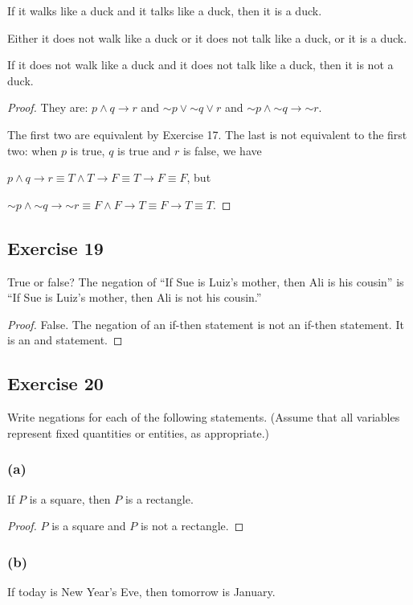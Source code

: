 \documentclass[14pt]{extarticle}
\begin{document}
If it walks like a duck and it talks like a duck, then it is a duck.

Either it does not walk like a duck or it does not talk like a duck, or it is a duck.

If it does not walk like a duck and it does not talk like a duck, then it is not a duck.

\begin{proof}
    They are: $p \wedge q \to r$ and ${\sim p} \vee {\sim q} \vee r$ and ${\sim p} \wedge {\sim q} \to {\sim r}$.

    The first two are equivalent by Exercise 17. The last is not equivalent to the first two: when $p$ is true, $q$ is true and $r$ is false, we have

    $p \wedge q \to r \equiv T \wedge T \to F \equiv T \to F \equiv F$, but

    ${\sim p} \wedge {\sim q} \to {\sim r} \equiv F \wedge F \to T \equiv F \to T \equiv T$.
\end{proof}

\subsection{Exercise 19} True or false? The negation of “If Sue is Luiz’s mother, then Ali is his cousin” is “If Sue is Luiz’s mother, then Ali is not his cousin.”

\begin{proof}
    False. The negation of an if-then statement is not an if-then
    statement. It is an and statement.
\end{proof}

\subsection{Exercise 20}
Write negations for each of the following statements. (Assume that all variables represent fixed quantities or entities, as
appropriate.)

\subsubsection{(a)}
If $P$ is a square, then $P$ is a rectangle.

\begin{proof}
    $P$ is a square and $P$ is not a rectangle.
\end{proof}

\subsubsection{(b)}
If today is New Year’s Eve, then tomorrow is January.
\end{document}
